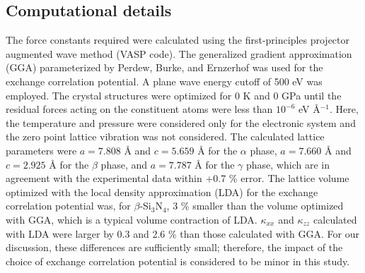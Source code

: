 \documentclass[twocolumn,amsmath,amssymb,a4paper,prb,superscriptaddress,floatfix]{revtex4-1}
\begin{document}
\subsection{Computational details}

The force constants required were calculated using the
first-principles projector augmented wave method\cite{paw} (VASP
code\cite{vasp-1996,vasp-1995, vasp-1999}). The generalized gradient
approximation (GGA) parameterized by Perdew, Burke, and Ernzerhof\cite{pbe} was
used for the exchange correlation potential. A plane wave energy cutoff of 500
eV was employed. The crystal structures were optimized for 0 K and 0 GPa until
the residual forces acting on the constituent atoms were less than $10^{-6}$
eV \AA$^{-1}$. Here, the temperature and pressure were considered only for the
electronic system and the zero point lattice vibration was not considered. The
calculated lattice parameters were $a=7.808$ {\AA} and $c=5.659$ {\AA} for the
$\alpha$ phase, $a=7.660$ {\AA} and $c=2.925$ {\AA} for the $\beta$ phase, and
$a=7.787$ {\AA} for the $\gamma$ phase, which are in agreement with the experimental
data\cite{yashima,boulay,paszkowicz} within +0.7 \% error. The lattice volume
optimized with the local density approximation (LDA)\cite{lda} for the exchange
correlation potential was, for $\beta$-Si$_3$N$_4$, 3 \% smaller than the volume
optimized with GGA, which is a typical volume contraction of LDA.
$\kappa_{xx}$ and $\kappa_{zz}$ calculated with LDA were larger by 0.3 and 2.6
\% than those calculated with GGA. For our discussion, these differences are
sufficiently small; therefore, the impact of the choice of exchange correlation
potential is considered to be minor in this study.
\end{document}
